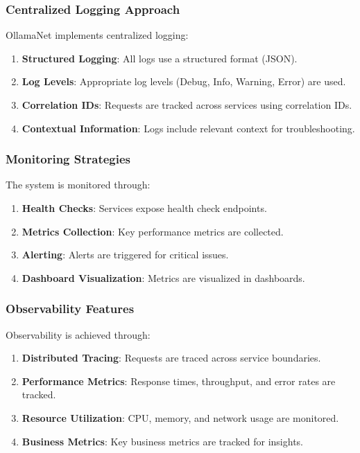 \subsubsection{Centralized Logging Approach}

OllamaNet implements centralized logging:

\begin{enumerate}
   \item \textbf{Structured Logging}: All logs use a structured format (JSON).
   \item \textbf{Log Levels}: Appropriate log levels (Debug, Info, Warning, Error) are used.
   \item \textbf{Correlation IDs}: Requests are tracked across services using correlation IDs.
   \item \textbf{Contextual Information}: Logs include relevant context for troubleshooting.
\end{enumerate}

\subsubsection{Monitoring Strategies}

The system is monitored through:

\begin{enumerate}
   \item \textbf{Health Checks}: Services expose health check endpoints.
   \item \textbf{Metrics Collection}: Key performance metrics are collected.
   \item \textbf{Alerting}: Alerts are triggered for critical issues.
   \item \textbf{Dashboard Visualization}: Metrics are visualized in dashboards.
\end{enumerate}

\subsubsection{Observability Features}

Observability is achieved through:

\begin{enumerate}
   \item \textbf{Distributed Tracing}: Requests are traced across service boundaries.
   \item \textbf{Performance Metrics}: Response times, throughput, and error rates are tracked.
   \item \textbf{Resource Utilization}: CPU, memory, and network usage are monitored.
   \item \textbf{Business Metrics}: Key business metrics are tracked for insights.
\end{enumerate}

